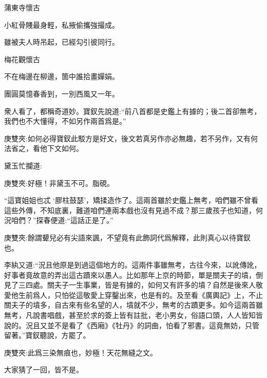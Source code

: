 \begin{poem}
    \emptypl
    \begin{pl}蒲東寺懷古　\end{pl}

    \begin{pl}小紅骨賤最身輕，私掖偷攜強撮成。\end{pl}

    \begin{pl}雖被夫人時吊起，已經勾引彼同行。\end{pl}

    \emptypl
    \begin{pl}梅花觀懷古　\end{pl}

    \begin{pl}不在梅邊在柳邊，箇中誰拾畫嬋娟。\end{pl}

    \begin{pl}團圓莫憶春香到，一別西風又一年。\end{pl}

\end{poem}


\begin{parag}
    衆人看了，都稱奇道妙。寶釵先說道:“前八首都是史鑑上有據的；後二首卻無考，我們也不大懂得，不如另作兩首爲是。”\begin{note}庚雙夾:如何必得寶釵此駁方是好文，後文若真另作亦必無趣，若不另作，又有何法省之，看他下文如何。\end{note}黛玉忙攔道:\begin{note}庚雙夾:好極！非黛玉不可。脂硯。\end{note}“這寶姐姐也忒 ‘膠柱鼓瑟’，矯揉造作了。這兩首雖於史鑑上無考，咱們雖不曾看這些外傳，不知底裏，難道咱們連兩本戲也沒有見過不成？那三歲孩子也知道，何況咱們？”探春便道:“這話正是了。”\begin{note}庚雙夾:餘謂顰兒必有尖語來諷，不望竟有此飾詞代爲解釋，此則真心以待寶釵也。\end{note}李紈又道:“況且他原是到過這個地方的。這兩件事雖無考，古往今來，以訛傳訛，好事者竟故意的弄出這古蹟來以愚人。比如那年上京的時節，單是關夫子的墳，倒見了三四處。關夫子一生事業，皆是有據的，如何又有許多的墳？自然是後來人敬愛他生前爲人，只怕從這敬愛上穿鑿出來，也是有的。及至看《廣輿記》上，不止關夫子的墳多，自古來有些名望的人，墳就不少，無考的古蹟更多。如今這兩首雖無考，凡說書唱戲，甚至於求的簽上皆有註批，老小男女，俗語口頭，人人皆知皆說的。況且又並不是看了《西廂》《牡丹》的詞曲，怕看了邪書。這竟無妨，只管留著。”寶釵聽說，方罷了。\begin{note}庚雙夾:此爲三染無痕也，妙極！天花無縫之文。\end{note}大家猜了一回，皆不是。
\end{parag}


